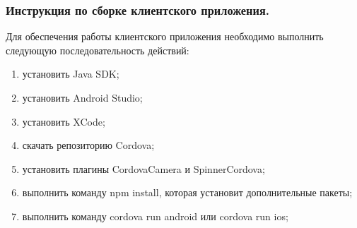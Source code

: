 \subsubsection{Инструкция по сборке клиентского приложения. }


Для обеспечения работы клиентского приложения необходимо выполнить следующую последовательность действий:
\begin{enumerate}
\item установить Java SDK;
\item установить Android Studio;
\item установить XCode;
\item скачать репозиторию Cordova;
\item установить плагины CordovaCamera и SpinnerCordova;
\item выполнить команду npm install, которая установит дополнительные пакеты;
\item выполнить команду cordova run android или cordova run ios;
\end{enumerate}